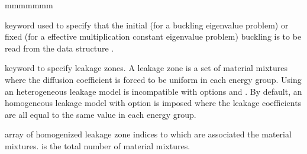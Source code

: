 \begin{ListeDeDescription}{mmmmmmm}
\item[\moc{IDEM}] keyword used to specify that the initial (for a buckling
eigenvalue problem) or fixed (for a effective multiplication constant eigenvalue
problem) buckling is to be read from the data structure . 

\item[\moc{MERG}] keyword to specify leakage zones. A leakage zone is a set of material
mixtures where the diffusion coefficient is forced to be uniform in each energy group.
Using an heterogeneous leakage model is incompatible with options  and .
By default, an homogeneous leakage model with option  is imposed where the leakage
coefficients are all equal to the same value in each energy group.  

\item[\dusa{imergl}] array of homogenized leakage zone indices to which are
associated the material mixtures.  is the total number of material mixtures.

\end{ListeDeDescription}
\eject
